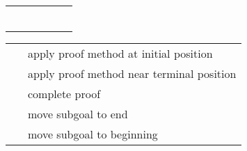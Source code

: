 \begin{isabellebody}
\begin{isamarkuptext}
\begin{tabular}{l|lllll}
    \mbox{\isa{iff}}
      & \isa{{\isachardoublequote}{\isasymtimes}{\isachardoublequote}}    &                    & \isa{{\isachardoublequote}{\isasymtimes}{\isachardoublequote}}          & \isa{{\isachardoublequote}{\isasymtimes}{\isachardoublequote}}         & \isa{{\isachardoublequote}{\isasymtimes}{\isachardoublequote}} \\
    \mbox{\isa{iff}}\isa{{\isachardoublequote}{\isacharquery}{\isachardoublequote}}
      & \isa{{\isachardoublequote}{\isasymtimes}{\isachardoublequote}} \\
    \mbox{\isa{elim}}\isa{{\isachardoublequote}{\isacharquery}{\isachardoublequote}} \mbox{\isa{intro}}\isa{{\isachardoublequote}{\isacharquery}{\isachardoublequote}}
      & \isa{{\isachardoublequote}{\isasymtimes}{\isachardoublequote}} \\
    \mbox{\isa{simp}}
      &                &                    &                      & \isa{{\isachardoublequote}{\isasymtimes}{\isachardoublequote}}         & \isa{{\isachardoublequote}{\isasymtimes}{\isachardoublequote}} \\
    \mbox{\isa{cong}}
      &                &                    &                      & \isa{{\isachardoublequote}{\isasymtimes}{\isachardoublequote}}         & \isa{{\isachardoublequote}{\isasymtimes}{\isachardoublequote}} \\
    \mbox{\isa{split}}
      &                &                    &                      & \isa{{\isachardoublequote}{\isasymtimes}{\isachardoublequote}}         & \isa{{\isachardoublequote}{\isasymtimes}{\isachardoublequote}} \\
  \end{tabular}%
\end{isamarkuptext}%
\isamarkuptrue%
%
\isamarkuptrue%
%
\isamarkuptrue%
%
\begin{isamarkuptext}%
\begin{tabular}{ll}
    \mbox{\isa{\isacommand{apply}}}~\isa{m} & apply proof method at initial position \\
    \mbox{\isa{\isacommand{apply{\isacharunderscore}end}}}~\isa{m} & apply proof method near terminal position \\
    \mbox{\isa{\isacommand{done}}} & complete proof \\
    \mbox{\isa{\isacommand{defer}}}~\isa{n} & move subgoal to end \\
    \mbox{\isa{\isacommand{prefer}}}~\isa{n} & move subgoal to beginning \\

\end{tabular}
\end{isamarkuptext}
\end{isabellebody}
